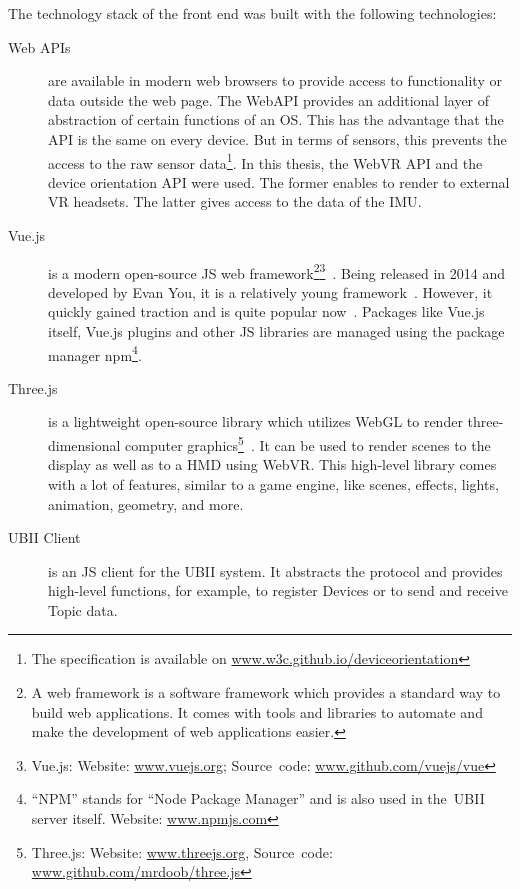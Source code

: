 The technology stack of the front end was built with the following technologies:
\begin{description}
	\item[Web APIs] are  available in modern web browsers to provide access to functionality or data outside the web page. The WebAPI provides an additional layer of abstraction of certain functions of an \gls{OS}. This has the advantage that the API is the same on every device. But in terms of sensors, this prevents the access to the raw sensor data\footnote{The specification is available on \href{https://w3c.github.io/deviceorientation/}{www.w3c.github.io/deviceorientation}}. In this thesis, the WebVR \gls{API} and the device orientation \gls{API} were used. The former enables to render to external \gls{VR} headsets. The latter gives access to the data of the \gls{IMU}.
	 
	\item[Vue.js] is a modern open-source \acrlong{JS} web framework\footnote{A web framework is a software framework which provides a standard way to build web applications. It comes with tools and libraries to automate and make the development of web applications easier.}\footnote{Vue.js: Website: \href{https://vuejs.org/}{www.vuejs.org}; Source~code: \href{https://github.com/vuejs/vue}{www.github.com/vuejs/vue}}~\cite{You.2019}. Being released in 2014 and developed by Evan You, it is a relatively young framework~\cite[17]{Koetsier.2016}. However, it quickly gained traction and is quite popular now~\cite[12\psq]{Koetsier.2016}.
  Packages like Vue.js itself, Vue.js plugins and other \acrlong{JS} libraries are managed using the package manager npm\footnote{\enquote{NPM} stands for \enquote{Node Package Manager} and is also used in the~\gls{UBII} server itself. Website: \href{https://www.npmjs.com/}{www.npmjs.com}}.
  
	\item[Three.js] is a lightweight open-source library which utilizes WebGL to render three-dimensional computer graphics\footnote{Three.js: Website: \href{https://threejs.org/}{www.threejs.org}, Source~code: \href{https://github.com/mrdoob/three.js/}{www.github.com/mrdoob/three.js}}~\cite{Cabello.2019}. It can be used to render scenes to the display as well as to a \gls{HMD} using WebVR. This high-level library comes with a lot of features, similar to a game engine, like scenes, effects, lights, animation, geometry, and more.
	 
	\item[UBII Client] is an \acrlong{JS} client for the \gls{UBII} system. It abstracts the protocol and provides high-level functions, for example, to register Devices or to send and receive Topic data.
\end{description}

